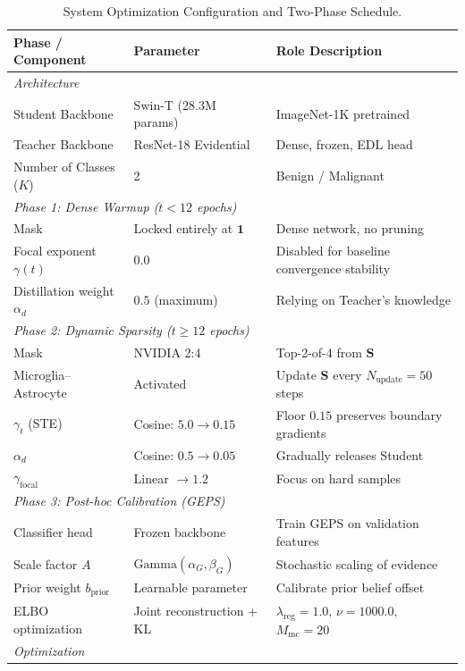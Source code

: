 \documentclass[letterpaper]{article} %
\begin{document}
\begin{table}[t]
\centering
\caption{System Optimization Configuration and Two-Phase Schedule.}
\label{tab:config}
\begin{tabular}{@{}lll@{}}
\toprule
\textbf{Phase / Component} & \textbf{Parameter} & \textbf{Role Description} \\
\midrule
\multicolumn{3}{l}{\emph{Architecture}} \\
Student Backbone & Swin-T (28.3M params) & ImageNet-1K pretrained \\
Teacher Backbone & ResNet-18 Evidential & Dense, frozen, EDL head \\
Number of Classes ($K$) & 2 & Benign / Malignant \\
\midrule
\multicolumn{3}{l}{\emph{Phase 1: Dense Warmup ($t < 12$ epochs)}} \\
Mask & Locked entirely at $\bm{1}$ & Dense network, no pruning \\
Focal exponent $\gamma(t)$ & $0.0$ & Disabled for baseline convergence stability \\
Distillation weight $\alpha_d$ & $0.5$ (maximum) & Relying on Teacher's knowledge \\
\midrule
\multicolumn{3}{l}{\emph{Phase 2: Dynamic Sparsity ($t \ge 12$ epochs)}} \\
Mask & NVIDIA 2:4 & Top-2-of-4 from $\bm{S}$ \\
Microglia--Astrocyte & Activated & Update $\bm{S}$ every $N_{\text{update}} = 50$ steps \\
$\gamma_t$ (STE) & Cosine: $5.0 \to 0.15$ & Floor $0.15$ preserves boundary gradients \\
$\alpha_d$ & Cosine: $0.5 \to 0.05$ & Gradually releases Student \\
$\gamma_{\text{focal}}$ & Linear $\to 1.2$ & Focus on hard samples \\
\midrule
\multicolumn{3}{l}{\emph{Phase 3: Post-hoc Calibration (GEPS)}} \\
Classifier head & Frozen backbone & Train GEPS on validation features \\
Scale factor $A$ & $\text{Gamma}(\alpha_G, \beta_G)$ & Stochastic scaling of evidence \\
Prior weight $b_{\text{prior}}$ & Learnable parameter & Calibrate prior belief offset \\
ELBO optimization & Joint reconstruction + KL & $\lambda_{\text{reg}}=1.0$, $\nu=1000.0$, $M_{\text{mc}}=20$ \\
\midrule
\multicolumn{3}{l}{\emph{Optimization}} \\

\end{tabular}
\end{table}
\end{document}
